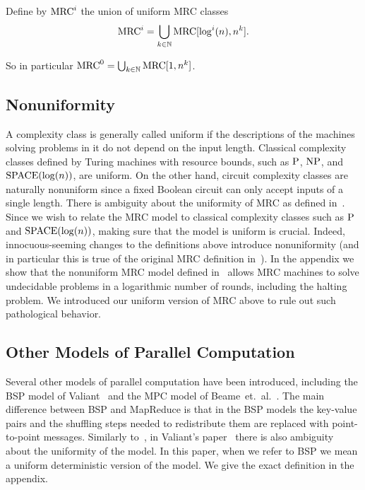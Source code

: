 \documentclass{llncs}
\newcommand{\N}{\mathbb{N}}
\newcommand{\mrc}{\textup{MRC}}
\renewcommand{\P}{\textup{P}}
\renewcommand{\L}{\textup{SPACE}(\log(n))}
\newcommand{\NP}{\textup{NP}}
\begin{document}
\begin{definition}
Define by $\mrc^i$ the union of uniform MRC classes
\[
   \mrc^i = \bigcup_{k\in\N}\mrc[\log^i(n),n^k].
\]
\end{definition}

So in particular $\mrc^0=\bigcup_{k\in\N}\text{MRC}[1,n^k]$. 

\subsection{Nonuniformity}  \label{subsec:nonuniformity}

A complexity class is generally called uniform if the descriptions of the
machines solving problems in it do not depend on the input length. Classical
complexity classes defined by Turing machines with resource bounds, such as
$\P$, $\NP$, and $\L$, are uniform. On the other hand, circuit complexity
classes are naturally nonuniform since a fixed Boolean circuit can only accept
inputs of a single length. There is ambiguity about the uniformity of MRC as
defined in~\cite{Karloff10}. Since we wish to relate the MRC model to classical
complexity classes such as $\P$ and $\L$, making sure that the model is uniform
is crucial. Indeed, innocuous-seeming changes to the definitions above
introduce nonuniformity (and in particular this is true of the original MRC
definition in~\cite{Karloff10}). In the appendix we show that the nonuniform
MRC model defined in~\cite{Karloff10} allows MRC machines to solve undecidable
problems in a logarithmic number of rounds, including the halting problem. We
introduced our uniform version of MRC above to rule out such pathological
behavior.

\subsection{Other Models of Parallel Computation} \label{subsec:bspmodel}

Several other models of parallel computation have been introduced, including
the BSP model of Valiant~\cite{Valiant90} and the MPC model of
Beame~et.~al.~\cite{BeameKS13}.  The main difference between BSP and MapReduce
is that in the BSP models the key-value pairs and the shuffling steps needed to
redistribute them are replaced with point-to-point messages.  Similarly
to~\cite{Karloff10}, in Valiant's paper~\cite{Valiant90} there is also
ambiguity about the uniformity of the model. In this paper, when we refer to
BSP we mean a uniform deterministic version of the model. We give the exact
definition in the appendix.
\end{document}
